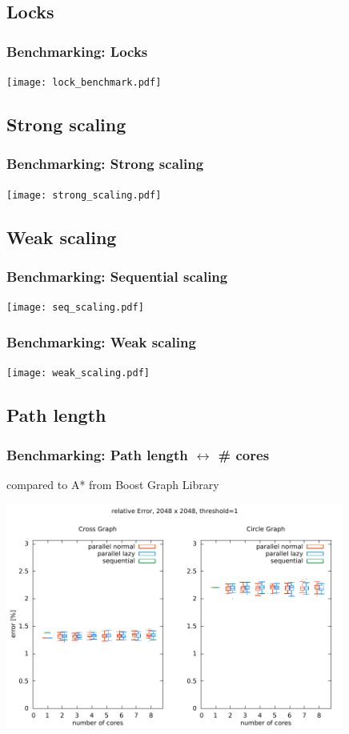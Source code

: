 \documentclass{beamer}
\begin{document}
\subsection{Locks}
\begin{frame}
\frametitle{Benchmarking: Locks}
\begin{center}
	\texttt{[image: lock\_benchmark.pdf]}
\end{center}
\end{frame}

\subsection{Strong scaling}
\begin{frame}
\frametitle{Benchmarking: Strong scaling}
\begin{center}
	\texttt{[image: strong\_scaling.pdf]}
\end{center}
\end{frame}

\subsection{Weak scaling}
\begin{frame}
\frametitle{Benchmarking: Sequential scaling}
\begin{center}
	\texttt{[image: seq\_scaling.pdf]}
\end{center}
\end{frame}

\begin{frame}
\frametitle{Benchmarking: Weak scaling}
\begin{center}
	\texttt{[image: weak\_scaling.pdf]}
\end{center}
\end{frame}

\subsection{Path length}
\begin{frame}
\frametitle{Benchmarking: Path length $\leftrightarrow$ \# cores}
compared to A* from Boost Graph Library
\begin{center}
	\includegraphics[height=210pt]{error_cores.pdf}
\end{center}
\end{frame}
\end{document}
